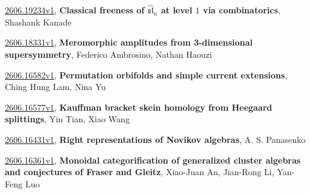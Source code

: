 \documentclass[9pt, a4paper]{article}
\theoremstyle{plain}
\theoremstyle{definition}
\theoremstyle{remark}
\newcommand{\arxiv}[3]{\href{https://arxiv.org/abs/#1}{#1}, \textbf{\textcolor{arxivblue}{#2}}, #3}
\begin{document}
\arxiv{2606.19234v1}{Classical freeness of $\widehat{\mathfrak{sl}}_n$ at level $1$ via combinatorics}{Shashank Kanade}

\arxiv{2606.18331v1}{Meromorphic amplitudes from 3-dimensional supersymmetry}{Federico Ambrosino, Nathan Haouzi}

\arxiv{2606.16582v1}{Permutation orbifolds and simple current extensions}{Ching Hung Lam, Nina Yu}

\arxiv{2606.16577v1}{Kauffman bracket skein homology from Heegaard splittings}{Yin Tian, Xiao Wang}

\arxiv{2606.16431v1}{Right representations of Novikov algebras}{A. S. Panasenko}

\arxiv{2606.16361v1}{Monoidal categorification of generalized cluster algebras and conjectures of Fraser and Gleitz}{Xiao-Juan An, Jian-Rong Li, Yan-Feng Luo}

\end{document}

